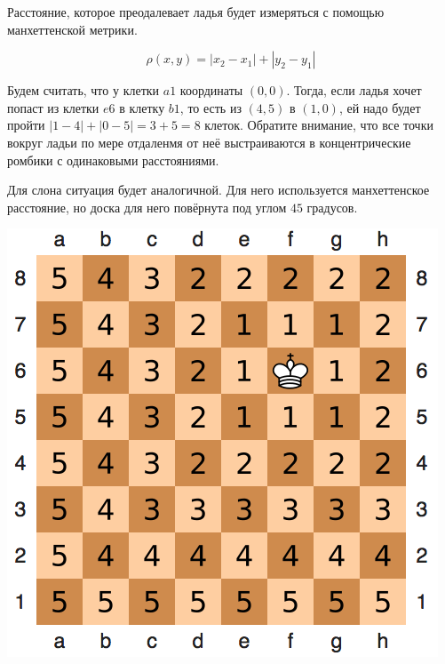 \documentclass[12pt, a4paper, oneside]{article}
\begin{document}
{Расстояние, которое преодалевает ладья будет измеряться с помощью манхеттенской метрики. 

\[ \rho(x,y) = |x_2 - x_1| + |y_2 - y_1| \]

Будем считать, что у клетки $a1$ координаты $(0,0)$. Тогда, если ладья хочет попаст из клетки $e6$ в клетку $b1$, то есть из $(4,5)$ в $(1,0)$, ей надо будет пройти $|1-4| + |0-5| = 3 + 5 = 8$ клеток. Обратите внимание, что все точки вокруг ладьи по мере отдаленмя от неё выстраиваются в концентрические ромбики с одинаковыми расстояниями. 

Для слона ситуация будет аналогичной. Для него используется манхеттенское расстояние, но доска для него повёрнута под углом $45$ градусов.  

\begin{minipage}[t]{0.45\textwidth}
	\includegraphics[scale=0.5]{king.png}
\end{minipage}
\hfill
\begin{minipage}[t]{0.45\textwidth}

\end{minipage}}
\end{document}
